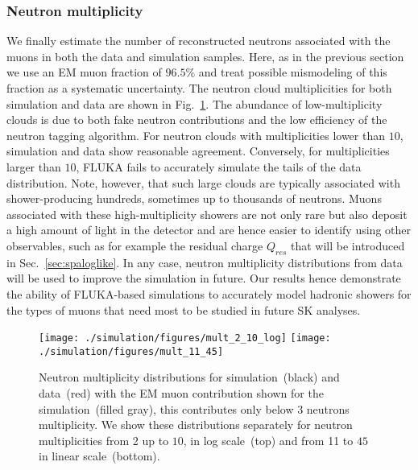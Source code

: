 \subsubsection{Neutron multiplicity}
We finally estimate the number of reconstructed neutrons associated with the muons in both the data and simulation samples. Here, as in the previous section we use an EM muon fraction of $96.5\%$ and treat possible mismodeling of this fraction as a systematic uncertainty. The neutron cloud multiplicities for both simulation and data are shown in Fig.~\ref{fig:neutmult}. The abundance of low-multiplicity clouds is due to both fake neutron contributions and the low efficiency of the neutron tagging algorithm. For neutron clouds with multiplicities lower than $10$, simulation and data show reasonable agreement. %
Conversely, for multiplicities larger than $10$, FLUKA fails to accurately simulate the tails of the data distribution. Note, however, that such large clouds are typically associated with shower-producing hundreds, sometimes up to thousands of neutrons. Muons associated with these high-multiplicity showers are not only rare but also deposit a high amount of light in the detector and are hence easier to identify using other observables, such as for example the residual charge $Q_{res}$ that will be introduced in Sec.~\ref{sec:spaloglike}. In any case, neutron multiplicity distributions from data will be used to improve the simulation in future.
Our results hence demonstrate the ability of FLUKA-based simulations to accurately model hadronic showers for the types of muons that need most to be studied in future SK analyses.
\begin{figure}
    \centering
    \texttt{[image: ./simulation/figures/mult\_2\_10\_log]}
    \texttt{[image: ./simulation/figures/mult\_11\_45]}
    \caption{Neutron multiplicity distributions for simulation~(black) and data~(red) with the EM muon contribution shown for the simulation~(filled gray), this contributes only below 3 neutrons multiplicity. We show these distributions separately for neutron multiplicities from 2 up to $10$, in log scale~(top) and from 11 to $45$ in linear scale~(bottom).}
    \label{fig:neutmult}
\end{figure}

